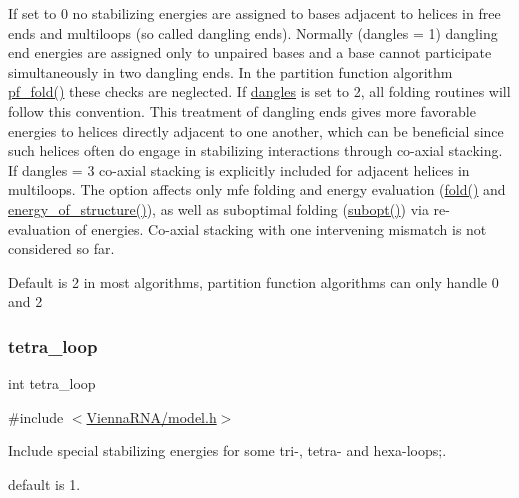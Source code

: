 If set to 0 no stabilizing energies are assigned to bases adjacent to helices in free ends and multiloops (so called dangling ends). Normally (dangles = 1) dangling end energies are assigned only to unpaired bases and a base cannot participate simultaneously in two dangling ends. In the partition function algorithm \mbox{\hyperlink{group__pf__fold_gadc3db3d98742427e7001a7fd36ef28c2}{pf\+\_\+fold()}} these checks are neglected. If \mbox{\hyperlink{group__model__details_ga72b511ed1201f7e23ec437e468790d74}{dangles}} is set to 2, all folding routines will follow this convention. This treatment of dangling ends gives more favorable energies to helices directly adjacent to one another, which can be beneficial since such helices often do engage in stabilizing interactions through co-\/axial stacking.~\newline
If dangles = 3 co-\/axial stacking is explicitly included for adjacent helices in multiloops. The option affects only mfe folding and energy evaluation (\mbox{\hyperlink{group__mfe__fold__single_gaadafcb0f140795ae62e5ca027e335a9b}{fold()}} and \mbox{\hyperlink{group__eval_gaf93986cb3cb29770ec9cca69c9fab8cf}{energy\+\_\+of\+\_\+structure()}}), as well as suboptimal folding (\mbox{\hyperlink{group__subopt__wuchty_ga700f662506a233e42dd7fda74fafd40e}{subopt()}}) via re-\/evaluation of energies. Co-\/axial stacking with one intervening mismatch is not considered so far.

Default is 2 in most algorithms, partition function algorithms can only handle 0 and 2 \mbox{\label{group__model__details_ga4f6265bdf0ead7ff4628a360adbfd77e}} 
\subsubsection{\texorpdfstring{tetra\+\_\+loop}{tetra\_loop}}
{\footnotesize\ttfamily int tetra\+\_\+loop}



{\ttfamily \#include $<$\mbox{\hyperlink{model_8h}{Vienna\+R\+N\+A/model.\+h}}$>$}



Include special stabilizing energies for some tri-\/, tetra-\/ and hexa-\/loops;. 

default is 1. \mbox{\label{group__model__details_ga097eccaabd6ae8b4fef83cccff85bb5d}} 

